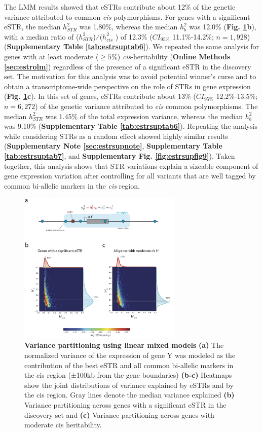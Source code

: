 The LMM results showed that eSTRs contribute about 12\% of the genetic variance attributed to common \emph{cis} polymorphisms. For genes with a significant eSTR, the median $h_{STR}^2$ was 1.80\%, whereas the median $h_b^2$ was 12.0\% (\textbf{Fig. \ref{fig:estrfig2}b}), with a median ratio of ($h_{STR}^2$)⁄($h_{cis}^2$ ) of 12.3\% ($CI_{95\%}$ 11.1\%-14.2\%; $n=1,928$) (\textbf{Supplementary Table \ref{tab:estrsuptab6}}). We repeated the same analysis for genes with at least moderate ($\geq 5\%$) \emph{cis}-heritability (\textbf{Online Methods \ref{sec:estrolm}}) regardless of the presence of a significant eSTR in the discovery set. The motivation for this analysis was to avoid potential winner's curse \cite{Ioannidis2008} and to obtain a transcriptome-wide perspective on the role of STRs in gene expression (\textbf{Fig. \ref{fig:estrfig2}c}). In this set of genes, eSTRs contribute about 13\% ($CI_{95\%}$ 12.2\%-13.5\%; $n=6,272$) of the genetic variance attributed to \emph{cis} common polymorphisms.  The median $h_{STR}^2$ was 1.45\% of the total expression variance, whereas the median $h_b^2$ was 9.10\% (\textbf{Supplementary Table \ref{tab:estrsuptab6}}). Repeating the analysis while considering STRs as a random effect showed highly similar results (\textbf{Supplementary Note \ref{sec:estrsupnote}}, \textbf{Supplementary Table \ref{tab:estrsuptab7}}, and \textbf{Supplementary Fig. \ref{fig:estrsupfig9}}). Taken together, this analysis shows that STR variations explain a sizeable component of gene expression variation after controlling for all variants that are well tagged by common bi-allelic markers in the \emph{cis} region. 

\begin{figure}[h!]
\centering
\label{fig:estrfig2}
\includegraphics[width=0.7\textwidth]{Figures/Chapter4/Fig2}
\caption{\textbf{Variance partitioning using linear mixed models} \textbf{(a)} The normalized variance of the expression of gene Y was modeled as the contribution of the best eSTR and all common bi-allelic markers in the cis region (±100kb from the gene boundaries) \textbf{(b-c)} Heatmaps show the joint distributions of variance explained by eSTRs and by the cis region. Gray lines denote the median variance explained \textbf{(b)} Variance partitioning across genes with a significant eSTR in the discovery set and \textbf{(c)} Variance partitioning across genes with moderate cis heritability. }
\end{figure}

